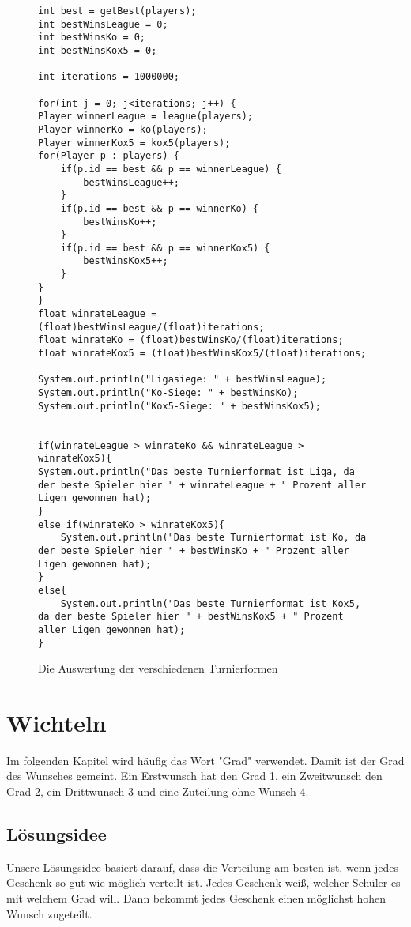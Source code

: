 \documentclass[a4paper, 12pt]{scrartcl}
\begin{document}
\begin{figure}[H]
\centering
\begin{lstlisting}
int best = getBest(players);
int bestWinsLeague = 0;
int bestWinsKo = 0;
int bestWinsKox5 = 0;

int iterations = 1000000;

for(int j = 0; j<iterations; j++) {
Player winnerLeague = league(players);
Player winnerKo = ko(players);
Player winnerKox5 = kox5(players);
for(Player p : players) {
    if(p.id == best && p == winnerLeague) {
        bestWinsLeague++;
    }
    if(p.id == best && p == winnerKo) {
        bestWinsKo++;
    }
    if(p.id == best && p == winnerKox5) {
        bestWinsKox5++;
    }
}
}
float winrateLeague = (float)bestWinsLeague/(float)iterations;
float winrateKo = (float)bestWinsKo/(float)iterations;
float winrateKox5 = (float)bestWinsKox5/(float)iterations;

System.out.println("Ligasiege: " + bestWinsLeague);
System.out.println("Ko-Siege: " + bestWinsKo);
System.out.println("Kox5-Siege: " + bestWinsKox5);


if(winrateLeague > winrateKo && winrateLeague > winrateKox5){
System.out.println("Das beste Turnierformat ist Liga, da der beste Spieler hier " + winrateLeague + " Prozent aller Ligen gewonnen hat);
}
else if(winrateKo > winrateKox5){
    System.out.println("Das beste Turnierformat ist Ko, da der beste Spieler hier " + bestWinsKo + " Prozent aller Ligen gewonnen hat);
}
else{
    System.out.println("Das beste Turnierformat ist Kox5, da der beste Spieler hier " + bestWinsKox5 + " Prozent aller Ligen gewonnen hat);
}

\end{lstlisting}
\caption{Die Auswertung der verschiedenen Turnierformen}
\end{figure}

\section{Wichteln}

Im folgenden Kapitel wird häufig das Wort "Grad" verwendet. Damit ist der Grad des Wunsches gemeint. Ein Erstwunsch hat den Grad 1, ein Zweitwunsch den Grad 2, ein Drittwunsch 3 und eine Zuteilung ohne Wunsch 4.

\subsection{Lösungsidee}

Unsere Lösungsidee basiert darauf, dass die Verteilung am besten ist, wenn jedes Geschenk so gut wie möglich verteilt ist. Jedes Geschenk weiß, welcher Schüler es mit welchem Grad will. Dann bekommt jedes Geschenk einen möglichst hohen Wunsch zugeteilt.
\end{document}
